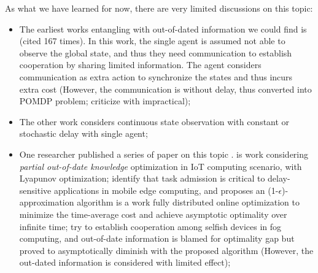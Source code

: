 As what we have learned for now, there are very limited discussions on this topic:
\begin{itemize}
    \item The earliest works entangling with out-of-dated information we could find is \cite{ref-01} (cited 167 times). In this work, the single agent is assumed not able to observe the global state, and thus they need communication to establish cooperation by sharing limited information. The agent considers communication as extra action to synchronize the states and thus incurs extra cost (However, the communication is without delay, thus converted into POMDP problem; criticize with impractical);
    \item The other work \cite{ref-02} considers continuous state observation with constant or stochastic delay with single agent;
    \item One researcher published a series of paper on this topic \cite{Lyu2017,Lyu2018,Lyu2018a,Lyu2018b}.
        \cite{Lyu2017} is work considering \emph{partial out-of-date knowledge} optimization in IoT computing scenario, with Lyapunov optimization;
         \cite{Lyu2018} identify that task admission is critical to delay-sensitive applications in mobile edge computing, and proposes an (1-$\epsilon$)-approximation algorithm
         \cite{Lyu2018a} is a work fully distributed online optimization to minimize the time-average cost and achieve asymptotic optimality over infinite time;
        \cite{Lyu2018b} try to establish cooperation among selfish devices in fog computing, and out-of-date information is blamed for optimality gap but proved to asymptotically diminish with the proposed algorithm (However, the out-dated information is considered with limited effect);
\end{itemize}

